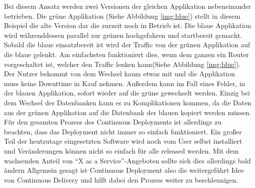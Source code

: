 Bei diesem Ansatz werden zwei Versionen der gleichen Applikation nebeneinander betrieben. Die grüne Applikation (Siehe Abbildung \ref{img:blue}) stellt in diesem Beispiel die alte Version dar die zurzeit noch in Betrieb ist. Die blaue Applikation wird währenddessen parallel zur grünen hochgefahren und startbereit gemacht. Sobald die blaue einsatzbereit ist wird der Traffic von der grünen Applikation auf die blaue gelenkt. Am einfachsten funktioniert dies, wenn dem ganzen ein Router vorgeschaltet ist, welcher den Traffic lenken kann(Siehe Abbildung \ref{img:blue}).\autocite[Vgl.][S.407]{Farley.2010} Der Nutzer bekommt von dem Wechsel kaum etwas mit und die Applikation muss keine Downttime in Kauf nehmen. Außerdem kann im Fall eines Fehler, in der blauen Applikation, sofort wieder auf die grüne gewechselt werden. Einzig bei dem Wechsel der Datenbanken kann es zu Komplikationen kommen, da die Daten aus der grünen Applikation auf die Datenbank der blauen kopiert werden müssen.\autocite[Vgl.][S.407]{Farley.2010}\\  
Für den gesamten Prozess des Continuous Deployments ist allerdings zu beachten, dass das Deployment nicht immer so einfach funktioniert. Ein großer Teil der heutzutage eingesetzten Software wird noch vom User selbst installiert und Veränderungen können nicht so einfach für alle released werden. Mit dem wachsenden Anteil von \enquote{X as a Service}-Angeboten\autocite[S.18]{Stahl.2018} sollte sich dies allerdings bald ändern\autocite[Vgl.][S.18]{Stahl.2018} Allgemein gesagt ist Continuous Deployment also die weitergeführt Idee von Continuous Delivery und hilft dabei den Prozess weiter zu beschleunigen.
